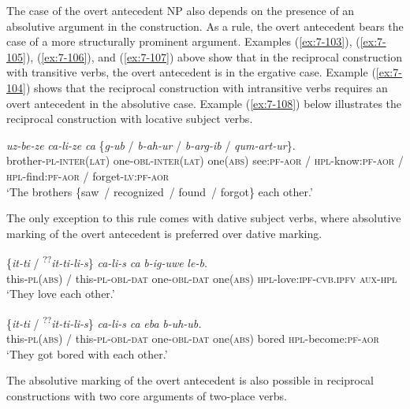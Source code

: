 ﻿\documentclass[output=paper]{langsci/langscibook}
\begin{document}
The case of the overt antecedent NP also depends on the presence of an
absolutive argument in the construction. As a rule, the overt antecedent
bears the case of a more structurally prominent argument. Examples (\ref{ex:7-103}),
(\ref{ex:7-105}), (\ref{ex:7-106}), and (\ref{ex:7-107}) above show that in the reciprocal construction
with transitive verbs, the overt antecedent is in the ergative case.
Example (\ref{ex:7-104}) shows that the reciprocal construction with intransitive
verbs requires an overt antecedent in the absolutive case. Example
(\ref{ex:7-108}) below illustrates the reciprocal construction with locative
subject verbs.
\pagebreak[3]

\ea \label{ex:7-108}
\gll \emph{uz-be-ze} \emph{ca-li-ze} \emph{ca} \{\emph{g-ub} / \emph{b-ah-ur} / \emph{b-arg-ib} / \emph{qum-art-ur}\}.\\
brother-\textsc{pl}-\textsc{inter(lat)} one-\textsc{obl}-\textsc{inter(lat)} one(\textsc{abs}) see:\textsc{pf}-\textsc{aor} / \textsc{hpl}-know:\textsc{pf}-\textsc{aor} / \textsc{hpl}-find:\textsc{pf}-\textsc{aor} / forget-\textsc{lv}:\textsc{pf}-\textsc{aor}\\
\glt `The brothers \{saw~/ recognized~/ found~/ forgot\} each other.'
\z

The only exception to this rule comes with dative subject verbs, where
absolutive marking of the overt antecedent is preferred over dative
marking.

\ea\label{ex:7-109}
\gll \{\emph{it-ti} / \textsuperscript{??}\emph{it-ti-li-s}\} \emph{ca-li-s} \emph{ca} \emph{b-ig-uwe} \emph{le-b.}\\
{this}-\textsc{pl}(\textsc{abs}) / {this}-\textsc{pl}-\textsc{obl}-\textsc{dat} one-\textsc{obl}-\textsc{dat} one(\textsc{abs}) \textsc{hpl}-love:\textsc{ipf}-\textsc{cvb.ipfv} \textsc{aux}-\textsc{hpl}\\
\glt `They love each other.'

\ex %
\gll \{\emph{it-ti} / \textsuperscript{??}\emph{it-ti-li-s}\} \emph{ca-li-s} \emph{ca} \emph{eba} \emph{b-uh-ub.}\\
{this}-\textsc{pl}(\textsc{abs}) / {this}-\textsc{pl}-\textsc{obl}-\textsc{dat} one-\textsc{obl}-\textsc{dat} one(\textsc{abs}) bored \textsc{hpl}-become:\textsc{pf}-\textsc{aor}\\
\glt `They got bored with each other.'
\z

The absolutive marking of the overt antecedent is also possible in
reciprocal constructions with two core arguments of two-place verbs.
\end{document}
